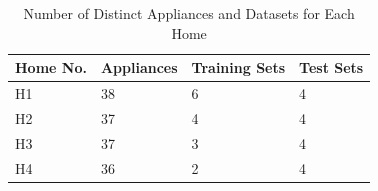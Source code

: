 \documentclass[conference]{IEEEtran}
\begin{document}
%			
%			
%			
%			
%			
%			
%			
%			


\begin{table}[h!]
	\renewcommand{\arraystretch}{1.3}
	\caption{Number of Distinct Appliances and Datasets for Each Home}\label{classes}
	\label{table:dataset}
	\centering
	\begin{tabular}{p{1.5cm}||p{1.5cm}||p{1.5cm}||p{1.5cm}}
		\hline 
	\textbf{Home No.} & \textbf{Appliances} &\textbf{Training Sets} &\textbf{Test Sets}\tabularnewline
		\hline 
		\hline 
		H1 & 38 & 6 & 4\tabularnewline
		\hline 
		H2 & 37 & 4 & 4\tabularnewline
		\hline 
		H3 & 37 & 3 & 4\tabularnewline
		\hline 
		H4 & 36 & 2 & 4\tabularnewline
		\hline 
	\end{tabular}
\end{table}
\end{document}
